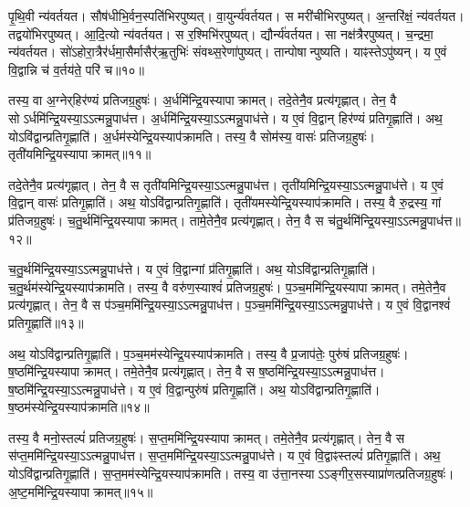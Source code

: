 पृ॒थि॒वी न्य॑वर्तयत।
सौष॑धीभि॒र्वन॒स्पति॑भिरपुष्यत्।
वा॒युर्न्य॑\-वर्तयत।
स मरी॑चीभिरपुष्यत्।
अ॒न्तरि॑क्षं॒ न्य॑वर्तयत।
तद्वयो॑भिर\-पुष्यत्।
आ॒दि॒त्यो न्य॑वर्तयत।
स र॒श्मिभि॑रपुष्यत्।
द्यौर्न्य॑\-वर्तयत।
सा नक्ष॑त्रैरपुष्यत्।
च॒न्द्रमा॒ न्य॑वर्तयत।
सो॑ऽहोरा॒त्रैर॑र्ध\-मा॒सैर्मासैर्॑ऋ॒तुभिः॑ संवथ्स॒रेणा॑पुष्यत्।
तान्पोषान्पुष्यति।
याꣴस्ते\-ऽपु॑ष्यन्।
य ए॒वं वि॒द्वान्नि च॑ व॒र्तय॑ते॒ परि॑ च॥१०॥\anuvakamend[अ॒पु॒ष्य॒न्नक्ष॑त्रैरपुष्य॒त्पञ्च॑ च]

तस्य॒ वा अ॒ग्नेर्‌\mbox{}हिर॑ण्यं प्रतिजग्र॒हुषः॑।
अ॒र्धमि॑न्द्रि॒य\-स्यापा\-क्रामत्।
तदे॒तेनै॒व प्रत्य॑गृह्णात्।
तेन॒ वै सो\-ऽर्धमि॑न्द्रि॒य\-स्या॒\-ऽऽत्मन्नु॒पा\-ध॑त्त।
अ॒र्धमि॑न्द्रि॒य\-स्या॒\-ऽऽत्मन्नु॒पा\-ध॑त्ते।
य ए॒वं वि॒द्वान् हिर॑ण्यं प्रतिगृ॒ह्णाति॑।
अथ॒ योऽवि॑द्वान्प्रति\-गृ॒ह्णाति॑।
अ॒र्धम॑स्येन्द्रि॒य\-स्याप॑\-क्रामति।
तस्य॒ वै सोम॑स्य॒ वासः॑ प्रतिजग्र॒हुषः॑।
तृती॑यमिन्द्रि॒य\-स्यापाक्रामत्॥११॥

तदे॒तेनै॒व प्रत्य॑गृह्णात्।
तेन॒ वै स तृती॑यमिन्द्रि॒य\-\-स्या॒\-ऽऽत्मन्नु॒पा\-ध॑त्त।
तृती॑यमिन्द्रि॒य\-\-स्या॒\-ऽऽत्मन्नु॒पा\-ध॑त्ते।
य ए॒वं वि॒द्वान् वासः॑ प्रतिगृ॒ह्णाति॑।
अथ॒ योऽवि॑द्वान्प्रति\-गृ॒ह्णाति॑।
तृती॑यमस्येन्द्रि॒य\-स्याप॑\-क्रामति।
तस्य॒ वै रु॒द्रस्य॒ गां प्र॑तिजग्र॒हुषः॑।
च॒तु॒र्थमि॑न्द्रि॒य\-\-स्यापा\-क्रामत्।
तामे॒तेनै॒व प्रत्य॑गृह्णात्।
तेन॒ वै स च॑तु॒र्थमि॑न्द्रि॒य\-\-स्या॒\-ऽऽत्मन्नु॒पा\-ध॑त्त॥१२॥

च॒तु॒र्थमि॑न्द्रि॒य\-\-स्या॒\-ऽऽत्मन्नु॒पा\-ध॑त्ते।
य ए॒वं वि॒द्वान्गां प्र॑तिगृ॒ह्णाति॑।
अथ॒ योऽवि॑द्वान्प्रतिगृ॒ह्णाति॑।
च॒तु॒र्थम॑स्येन्द्रि॒य\-\-स्याप॑\-क्रामति।
तस्य॒ वै वरु॑ण॒स्याश्वं॑ प्रतिजग्र॒हुषः॑।
प॒ञ्च॒ममि॑न्द्रि॒य\-\-स्यापा\-क्रामत्।
तमे॒तेनै॒व प्रत्य॑गृह्णात्।
तेन॒ वै स प॑ञ्च॒ममि॑न्द्रि॒य\-\-स्या॒\-ऽऽत्मन्नु॒पा\-ध॑त्त।
प॒ञ्च॒ममि॑न्द्रि॒य\-स्या॒\-ऽऽत्मन्नु॒पा\-ध॑त्ते।
य ए॒वं वि॒द्वानश्वं॑ प्रति\-गृ॒ह्णाति॑॥१३॥

अथ॒ योऽवि॑द्वान्प्रतिगृ॒ह्णाति॑।
प॒ञ्च॒मम॑स्येन्द्रि॒य\-स्याप॑\-क्रामति।
तस्य॒ वै प्र॒जाप॑तेः॒ पुरु॑षं प्रति\-जग्र॒हुषः॑।
ष॒ष्ठमि॑न्द्रि॒य\-स्यापाक्रामत्।
तमे॒तेनै॒व प्रत्य॑गृह्णात्।
तेन॒ वै स ष॒ष्ठमि॑न्द्रि॒य\-स्या॒\-ऽऽत्मन्नु॒पा\-ध॑त्त।
ष॒ष्ठमि॑न्द्रि॒य\-स्या॒\-ऽऽत्मन्नु॒पा\-ध॑त्ते।
य ए॒वं वि॒द्वान्पुरु॑षं प्रति\-गृ॒ह्णाति॑।
अथ॒ योऽवि॑द्वान्प्रति\-गृ॒ह्णाति॑।
ष॒ष्ठम॑स्येन्द्रि॒य\-स्याप॑\-क्रामति॥१४॥

तस्य॒ वै मनो॒स्तल्पं॑ प्रति\-जग्र॒हुषः॑।
स॒प्त॒ममि॑न्द्रि॒य\-स्यापा\-क्रामत्।
तमे॒तेनै॒व प्रत्य॑\-गृह्णात्।
तेन॒ वै स स॑प्त॒ममि॑न्द्रि॒य\-स्या॒\-ऽऽत्मन्नु॒पा\-ध॑त्त।
स॒प्त॒ममि॑न्द्रि॒य\-स्या॒\-ऽऽत्मन्नु॒पा\-ध॑त्ते।
य ए॒वं वि॒द्वाꣴस्तल्पं॑ प्रति\-गृ॒ह्णाति॑।
अथ॒ यो\-ऽवि॑द्वान्प्रति\-गृ॒ह्णाति॑।
स॒प्त॒मम॑स्येन्द्रि॒य\-स्याप॑\-क्रामति।
तस्य॒ वा उ॑त्ता॒नस्या\-ऽऽङ्गीर॒सस्याप्रा॑णत्प्रति\-जग्र॒हुषः॑।
अ॒ष्ट॒ममि॑न्द्रि॒य\-स्यापाक्रामत्॥१५॥


